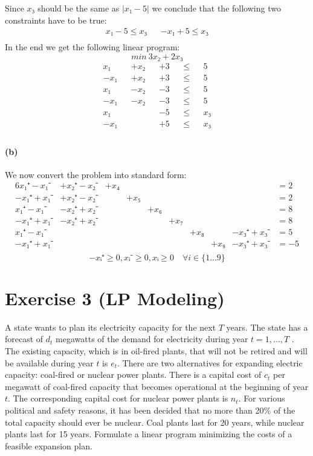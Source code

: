 \documentclass[a4paper, 12pt]{report}
\begin{document}
Since $x₃$ should be the same as $|x₁-5|$ we conclude that the following two
constraints have to be true:
\begin{align*}
    x₁-5 ≤ x₃ && -x₁+5 ≤ x₃\\
\end{align*}
In the end we get the following linear program:
\[
    min~ 3x₂ + 2x₃
\]
\begin{align*}
     x₁ && +x₂ && +3  && ≤ && 5  \\
    -x₁ && +x₂ && +3  && ≤ && 5  \\
     x₁ && -x₂ && -3  && ≤ && 5  \\
    -x₁ && -x₂ && -3  && ≤ && 5  \\
     x₁ &&     && -5  && ≤ && x₃ \\
    -x₁ &&     && +5  && ≤ && x₃ \\
\end{align*}

\paragraph{(b)}
We now convert the problem into standard form:
\begin{alignat*}{6}
     x₁⁺- x₁⁻ & +x₂⁺- x₂⁻ &+x₄&   &   &   &   &     &             &=  2\\
    -x₁⁺+ x₁⁻ & +x₂⁺- x₂⁻ &   &+x₅&   &   &   &     &             &=  2\\
     x₁⁺- x₁⁻ & -x₂⁺+ x₂⁻ &   &   &+x₆&   &   &     &             &=  8\\
    -x₁⁺+ x₁⁻ & -x₂⁺+ x₂⁻ &   &   &   &+x₇&   &     &             &=  8\\
     x₁⁺- x₁⁻ &           &   &   &   &   &+x₈&     & - x₃⁺ + x₃⁻ &=  5\\
    -x₁⁺+ x₁⁻ &           &   &   &   &   &   & +x₉ & - x₃⁺ + x₃⁻ &= -5\\
\end{alignat*}
\[
    -xᵢ⁺ ≥ 0, xᵢ⁻ ≥ 0,xᵢ ≥ 0 \quad ∀ i ∈ \{1…9\}
\]

\section{Exercise 3 (LP Modeling)}

A state wants to plan its electricity capacity for the next $T$ years. The
state has a forecast of $d_t$ megawatts of the demand for electricity during
year $t = 1, …, T$ . The existing capacity, which is in oil-fired plants, that
will not be retired and will be available during year $t$ is $e_t$. There are
two alternatives for expanding electric capacity: coal-fired or nuclear power
plants. There is a capital cost of $c_t$ per megawatt of coal-fired capacity
that becomes operational at the beginning of year $t$. The corresponding
capital cost for nuclear power plants is $n_t$. For various political and
safety reasons, it has been decided that no more than 20\% of the total
capacity should ever be nuclear. Coal plants last for 20 years, while nuclear
plants last for 15 years. Formulate a linear program minimizing the costs of a
feasible expansion plan.
\end{document}
